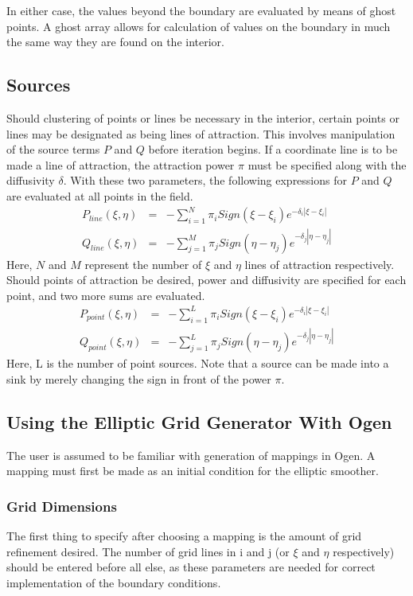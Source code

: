In either case, the values beyond the boundary are evaluated by means of ghost points.   
A ghost array allows for calculation of values on the boundary in much the same way they
are found on the interior.

\subsection{Sources}

Should clustering of points or lines be necessary in the interior, certain points or lines
may be designated as being lines of attraction.  This involves manipulation of the source 
terms $P$ and $Q$ before iteration begins.  If a coordinate line is to be made a
line of attraction,
the attraction power $\pi$ must be specified along with the diffusivity
$\delta$.  With these two parameters, the following expressions
for $P$ and $Q$ are evaluated at all points in the field.
\begin{eqnarray*}
P_{line}(\xi,\eta) &=& -\sum_{i=1}^{N}\pi_{i}Sign(\xi-\xi_i)e^{-\delta_i|\xi-\xi_i|} \\
Q_{line}(\xi,\eta) &=& -\sum_{j=1}^{M}\pi_{j}Sign(\eta-\eta_j)e^{-\delta_j|\eta-\eta_j|}
\end{eqnarray*}
Here, $N$ and $M$ represent the number of $\xi$ and $\eta$ lines of attraction respectively.
Should points of attraction be desired, power and diffusivity are specified
for each point, and two more sums are evaluated.
\begin{eqnarray*}
P_{point}(\xi,\eta) &=& -\sum_{i=1}^{L}\pi_{i}Sign(\xi-\xi_i)e^{-\delta_i|\xi-\xi_i|} \\
Q_{point}(\xi,\eta) &=& -\sum_{j=1}^{L}\pi_{j}Sign(\eta-\eta_j)e^{-\delta_j|\eta-\eta_j|}
\end{eqnarray*}
Here, L is the number of point sources.  Note that a source can be made into a sink by
merely changing the sign in front of the power $\pi$.

\subsection{Using the Elliptic Grid Generator With Ogen}

The user is assumed to be familiar with generation of mappings in Ogen.  A mapping
must first be made as an initial condition for the elliptic smoother.

\subsubsection{Grid Dimensions}
The first thing to specify after choosing a mapping is the amount of grid refinement desired.
The number of grid lines in i and j (or $\xi$ and $\eta$ respectively) should be 
entered before all else, as these parameters are needed for correct implementation of
the boundary conditions.

